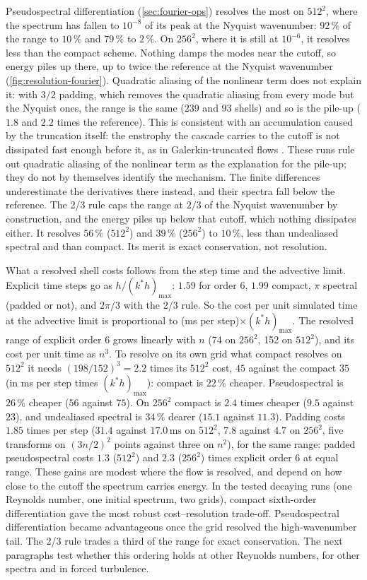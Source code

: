 \documentclass[11pt,a4paper]{article}
\begin{document}
Pseudospectral differentiation (\cref{sec:fourier-ops}) resolves the most on $512^2$, where the spectrum has fallen to $10^{-8}$ of its peak at the Nyquist wavenumber: $92\,\%$ of the range to $10\,\%$ and $79\,\%$ to $2\,\%$.  On $256^2$, where it is still at $10^{-6}$, it resolves less than the compact scheme.  Nothing damps the modes near the cutoff, so energy piles up there, up to twice the reference at the Nyquist wavenumber (\cref{fig:resolution-fourier}).  Quadratic aliasing of the nonlinear term does not explain it: with $3/2$ padding, which removes the quadratic aliasing from every mode but the Nyquist ones, the range is the same ($239$ and $93$ shells) and so is the pile-up ($1.8$ and $2.2$ times the reference).  This is consistent with an accumulation caused by the truncation itself: the enstrophy the cascade carries to the cutoff is not dissipated fast enough before it, as in Galerkin-truncated flows \cite{frisch2008}.  These runs rule out quadratic aliasing of the nonlinear term as the explanation for the pile-up; they do not by themselves identify the mechanism.  The finite differences underestimate the derivatives there instead, and their spectra fall below the reference.  The 2/3 rule caps the range at $2/3$ of the Nyquist wavenumber by construction, and the energy piles up below that cutoff, which nothing dissipates either.  It resolves $56\,\%$ ($512^2$) and $39\,\%$ ($256^2$) to $10\,\%$, less than undealiased spectral and than compact.  Its merit is exact conservation, not resolution.

What a resolved shell costs follows from the step time and the advective limit.  Explicit time steps go as $h/(k^*h)_{\max}$: $1.59$ for order 6, $1.99$ compact, $\pi$ spectral (padded or not), and $2\pi/3$ with the 2/3 rule.  So the cost per unit simulated time at the advective limit is proportional to (ms per step)$\times(k^*h)_{\max}$.  The resolved range of explicit order 6 grows linearly with $n$ (74 on $256^2$, 152 on $512^2$), and its cost per unit time as $n^3$.  To resolve on its own grid what compact resolves on $512^2$ it needs $(198/152)^3=2.2$ times its $512^2$ cost, $45$ against the compact $35$ (in ms per step times $(k^*h)_{\max}$): compact is $22\,\%$ cheaper.  Pseudospectral is $26\,\%$ cheaper ($56$ against $75$).  On $256^2$ compact is $2.4$ times cheaper ($9.5$ against $23$), and undealiased spectral is $34\,\%$ dearer ($15.1$ against $11.3$).  Padding costs $1.85$ times per step ($31.4$ against $17.0\,\mathrm{ms}$ on $512^2$, $7.8$ against $4.7$ on $256^2$, five transforms on $(3n/2)^2$ points against three on $n^2$), for the same range: padded pseudospectral costs $1.3$ ($512^2$) and $2.3$ ($256^2$) times explicit order 6 at equal range.  These gains are modest where the flow is resolved, and depend on how close to the cutoff the spectrum carries energy.  In the tested decaying runs (one Reynolds number, one initial spectrum, two grids), compact sixth-order differentiation gave the most robust cost--resolution trade-off.  Pseudospectral differentiation became advantageous once the grid resolved the high-wavenumber tail.  The 2/3 rule trades a third of the range for exact conservation.  The next paragraphs test whether this ordering holds at other Reynolds numbers, for other spectra and in forced turbulence.
\end{document}
